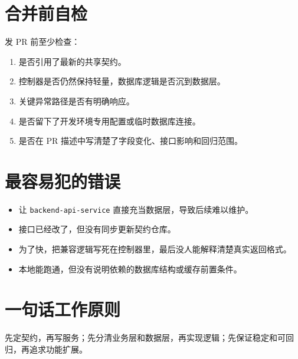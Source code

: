 \documentclass[11pt,a4paper]{ctexart}
\begin{document}
\section{合并前自检}

发 PR 前至少检查：

\begin{enumerate}
  \item 是否引用了最新的共享契约。
  \item 控制器是否仍然保持轻量，数据库逻辑是否沉到数据层。
  \item 关键异常路径是否有明确响应。
  \item 是否留下了开发环境专用配置或临时数据库连接。
  \item 是否在 PR 描述中写清楚了字段变化、接口影响和回归范围。
\end{enumerate}

\section{最容易犯的错误}

\begin{itemize}
  \item 让 \texttt{backend-api-service} 直接充当数据层，导致后续难以维护。
  \item 接口已经改了，但没有同步更新契约仓库。
  \item 为了快，把兼容逻辑写死在控制器里，最后没人能解释清楚真实返回格式。
  \item 本地能跑通，但没有说明依赖的数据库结构或缓存前置条件。
\end{itemize}

\section{一句话工作原则}

先定契约，再写服务；先分清业务层和数据层，再实现逻辑；先保证稳定和可回归，再追求功能扩展。
\end{document}
